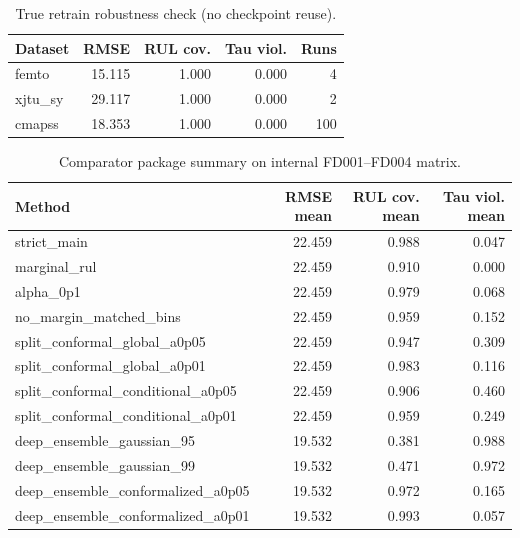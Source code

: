 \begin{table}[t]
\centering
\caption{True retrain robustness check (no checkpoint reuse).}
\label{tab:retrain-robustness}
\begin{tabular}{lrrrr}
\toprule
Dataset & RMSE & RUL cov. & Tau viol. & Runs\\
\midrule
femto & 15.115 & 1.000 & 0.000 & 4\\
xjtu\_sy & 29.117 & 1.000 & 0.000 & 2\\
cmapss & 18.353 & 1.000 & 0.000 & 100\\
\bottomrule
\end{tabular}
\end{table}

\begin{table}[t]
\centering
\caption{Comparator package summary on internal FD001--FD004 matrix.}
\label{tab:comparators}
\begin{tabular}{lrrr}
\toprule
Method & RMSE mean & RUL cov. mean & Tau viol. mean\\
\midrule
strict\_main & 22.459 & 0.988 & 0.047\\
marginal\_rul & 22.459 & 0.910 & 0.000\\
alpha\_0p1 & 22.459 & 0.979 & 0.068\\
no\_margin\_matched\_bins & 22.459 & 0.959 & 0.152\\
split\_conformal\_global\_a0p05 & 22.459 & 0.947 & 0.309\\
split\_conformal\_global\_a0p01 & 22.459 & 0.983 & 0.116\\
split\_conformal\_conditional\_a0p05 & 22.459 & 0.906 & 0.460\\
split\_conformal\_conditional\_a0p01 & 22.459 & 0.959 & 0.249\\
deep\_ensemble\_gaussian\_95 & 19.532 & 0.381 & 0.988\\
deep\_ensemble\_gaussian\_99 & 19.532 & 0.471 & 0.972\\
deep\_ensemble\_conformalized\_a0p05 & 19.532 & 0.972 & 0.165\\
deep\_ensemble\_conformalized\_a0p01 & 19.532 & 0.993 & 0.057\\
\bottomrule
\end{tabular}
\end{table}

